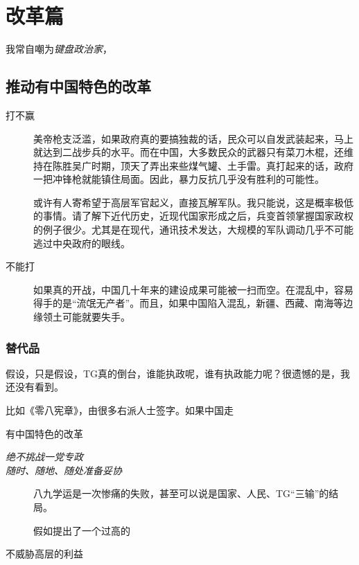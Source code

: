\chapter{改革篇}
\begin{quoting}
我常自嘲为\textit{键盘政治家}，
\end{quoting}

\section{推动有中国特色的改革}

\begin{description}
\item[打不赢] 美帝枪支泛滥，如果政府真的要搞独裁的话，民众可以自发武装起来，马上就达到二战步兵的水平。而在中国，大多数民众的武器只有菜刀木棍，还维持在陈胜吴广时期，顶天了弄出来些煤气罐、土手雷。真打起来的话，政府一把冲锋枪就能镇住局面。因此，暴力反抗几乎没有胜利的可能性。

或许有人寄希望于高层军官起义，直接瓦解军队。我只能说，这是概率极低的事情。请了解下近代历史，近现代国家形成之后，兵变首领掌握国家政权的例子很少。尤其是在现代，通讯技术发达，大规模的军队调动几乎不可能逃过中央政府的眼线。
\item[不能打] 如果真的开战，中国几十年来的建设成果可能被一扫而空。在混乱中，容易得手的是“流氓无产者”。而且，如果中国陷入混乱，新疆、西藏、南海等边缘领土可能就要失手。

\item[]
\end{description}

\subsection{替代品}
假设，只是假设，TG真的倒台，谁能执政呢，谁有执政能力呢？很遗憾的是，我还没有看到。

比如《零八宪章》，由很多右派人士签字。如果中国走

有中国特色的改革

\begin{description}
\item[\emph{绝不挑战一党专政}] 

\item[\emph{随时、随地、随处准备妥协}] 八九学运是一次惨痛的失败，甚至可以说是国家、人民、TG“三输”的结局。

假如提出了一个过高的
\item[不威胁高层的利益]
\end{description}

